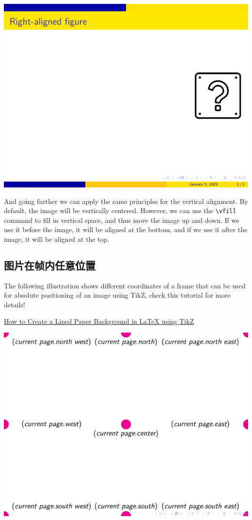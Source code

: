 \begin{column}{0.5\textwidth}
\includegraphics[page=2]{examples/beamer/beamerfigure05.pdf}

And going further we can apply the same principles for the vertical alignment. By default, the image will be vertically centered. However, we can use the \verb|\vfill| command to fill in vertical space, and thus move the image up and down. If we use it before the image, it will be aligned at the bottom, and if we use it after the image, it will be aligned at the top.

\subsection{图片在帧内任意位置}

The following illustration shows different coordinates of a frame that can be used for absolute positioning of an image using TikZ, check this tutorial for more details!

\href{https://latexdraw.com/how-to-create-a-lined-paper-background-in-latex-using-tikz/}{How to Create a Lined Paper Background in LaTeX using TikZ}

\includegraphics[page=1]{examples/beamer/beamer-frame-position.pdf}


\end{column}
